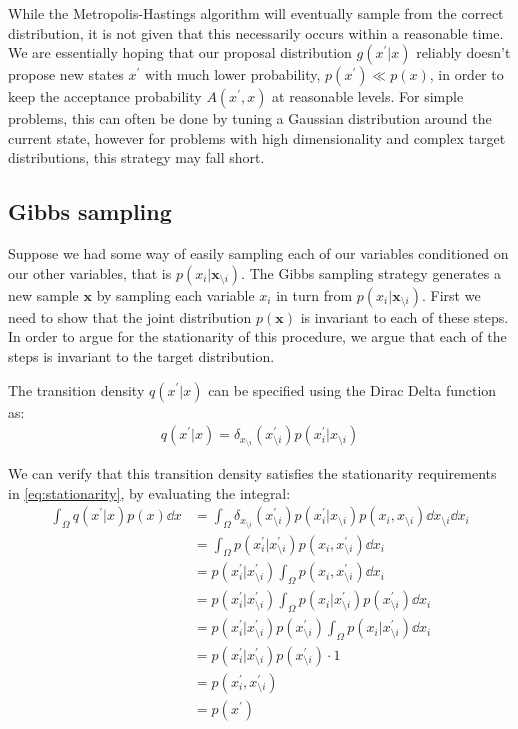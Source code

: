 While the Metropolis-Hastings algorithm will eventually sample from the correct distribution, it is not given that this necessarily occurs within a reasonable time. 
We are essentially hoping that our proposal distribution $g(x^\prime | x)$ reliably doesn't propose new states $x^\prime$ with much lower probability, $p(x^\prime) \ll p(x) $, in order to keep the acceptance probability $A(x^\prime, x)$ at reasonable levels. 
For simple problems, this can often be done by tuning a Gaussian distribution around the current state, however for problems with high dimensionality and complex target distributions, this strategy may fall short.

\subsection{Gibbs sampling}

Suppose we had some way of easily sampling each of our variables conditioned on our other variables, that is $p(x_i|\bm{x}_{\setminus i})$. 
The Gibbs sampling strategy generates a new sample $\bm{x}$ by sampling each variable $x_i$ in turn from $p(x_i|\bm{x}_{\setminus i})$.  
First we need to show that the joint distribution $p(\bm{x})$ is invariant to each of these steps. 
In order to argue for the stationarity of this procedure, we argue that each of the steps is invariant to the target distribution.

The transition density $q(x^\prime| x)$ can be specified using the Dirac Delta function as:
\begin{align*}
    q(x^\prime| x) = \delta_{x_{\setminus i}}(x^\prime_{\setminus i}) p(x_i^\prime|x_{\setminus i})
\end{align*}

We can verify that this transition density satisfies the stationarity requirements in \cref{eq:stationarity}, by evaluating the integral:
\begin{align*}
    \int_{\Omega} q(x^\prime| x) p(x) \dd{x}  
    &= \int_{\Omega}  \delta_{x_{\setminus i}}(x^\prime_{\setminus i}) p(x_i^\prime|x_{\setminus i}) p(x_i,x_{\setminus i}) \dd{x_{\setminus i}} \dd{x_i} \\
    &= \int_{\Omega} p(x^\prime_i|x^\prime_{\setminus i}) p(x_i,x^\prime_{\setminus i}) \dd{x_i} \\ 
    &= p(x^\prime_i|x^\prime_{\setminus i}) \int_{\Omega}  p(x_i,x^\prime_{\setminus i}) \dd{x_i} \\ 
    &= p(x^\prime_i|x^\prime_{\setminus i}) \int_{\Omega}  p(x_i | x^\prime_{\setminus i}) p(x^\prime_{\setminus i}) \dd{x_i} \\ 
    &= p(x^\prime_i|x^\prime_{\setminus i}) p(x^\prime_{\setminus i}) \int_{\Omega}  p(x_i | x^\prime_{\setminus i})  \dd{x_i} \\ 
    &= p(x^\prime_i|x^\prime_{\setminus i}) p(x^\prime_{\setminus i}) \cdot 1 \\
    &=  p(x^\prime_i,x^\prime_{\setminus i})  \\
    &= p(x^\prime)
\end{align*}

